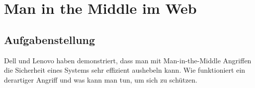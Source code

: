 \section{Man in the Middle im Web}
\subsection{Aufgabenstellung}
Dell und Lenovo haben demonstriert, dass man mit Man-in-the-Middle
Angriffen die Sicherheit eines Systems sehr effizient aushebeln kann.
Wie funktioniert ein derartiger Angriff und was kann man tun, um sich
zu schützen.
